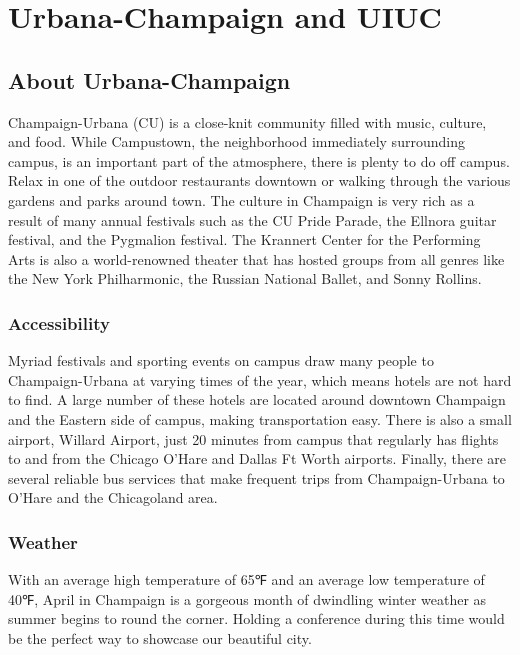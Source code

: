 \section{Urbana-Champaign and UIUC}

\subsection{About Urbana-Champaign}
Champaign-Urbana (CU) is a close-knit community filled with music, culture, and food. While Campustown, the neighborhood immediately surrounding campus,  is an important part of the atmosphere, there is plenty to do off campus. Relax in one of the outdoor restaurants downtown or walking through the various gardens and parks around town. The culture in Champaign is very rich as a result of many annual festivals such as the CU Pride Parade, the Ellnora guitar festival, and the Pygmalion festival. The Krannert Center for the Performing Arts is also a world-renowned theater that has hosted groups from all genres like the New York Philharmonic, the Russian National Ballet, and Sonny Rollins.

\subsubsection{Accessibility}
Myriad festivals and sporting events on campus draw many people to Champaign-Urbana at varying times of the year, which means hotels are not hard to find. A large number of these hotels are located around downtown Champaign and the Eastern side of campus, making transportation easy. There is also a small airport, Willard Airport, just 20 minutes from campus that regularly has flights to and from the Chicago O’Hare and Dallas Ft Worth airports. Finally, there are several reliable bus services that make frequent trips from Champaign-Urbana to O’Hare and the Chicagoland area.

\subsubsection{Weather}
With an average high temperature of 65℉ and an average low temperature of 40℉, April in Champaign is a gorgeous month of dwindling winter weather as summer begins to round the corner. Holding a conference during this time would be the perfect way to showcase our beautiful city.

